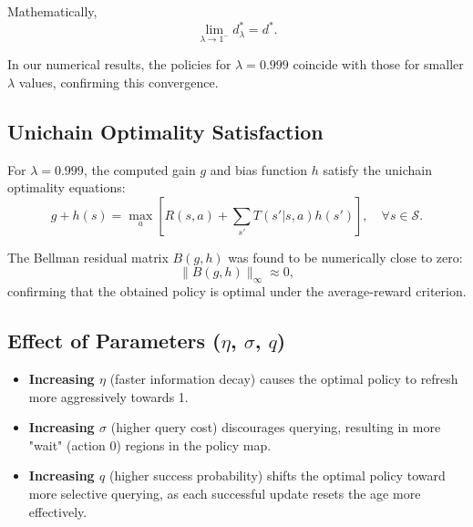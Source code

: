 \documentclass[12pt]{article}
\begin{document}
Mathematically,
$$\lim_{\lambda \to 1^-} d_\lambda^* = d^*.$$

In our numerical results, the policies for $\lambda = 0.999$ coincide with those for smaller $\lambda$ values, confirming this convergence.

\subsection{Unichain Optimality Satisfaction}

For $\lambda = 0.999$, the computed gain $g$ and bias function $h$ satisfy the unichain optimality equations:
$$g + h(s) = \max_a \left[ R(s, a) + \sum_{s'} T(s'|s, a) h(s') \right], \quad \forall s \in \mathcal{S}.$$

The Bellman residual matrix $B(g, h)$ was found to be numerically close to zero:
$$\|B(g, h)\|_\infty \approx 0,$$
confirming that the obtained policy is optimal under the average-reward criterion.

\subsection{Effect of Parameters ($\eta$, $\sigma$, $q$)}

\begin{itemize}
    \item \textbf{Increasing $\eta$} (faster information decay) causes the optimal policy to refresh more aggressively towards 1.
    \item \textbf{Increasing $\sigma$} (higher query cost) discourages querying, resulting in more "wait" (action 0) regions in the policy map.
    \item \textbf{Increasing $q$} (higher success probability) shifts the optimal policy toward more selective querying, as each successful update resets the age more effectively.
\end{itemize}
\end{document}
